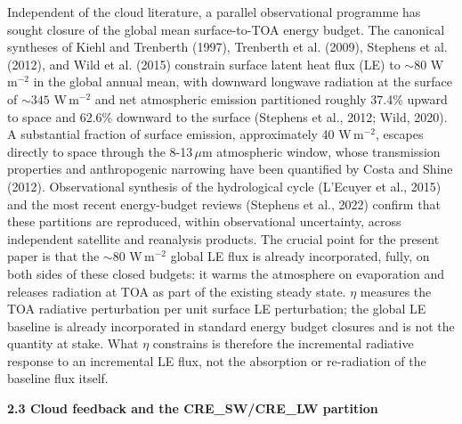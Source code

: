 Independent of the cloud literature, a parallel observational programme has sought closure of the global mean surface-to-TOA energy budget. The canonical syntheses of Kiehl and Trenberth (1997), Trenberth et al. (2009), Stephens et al. (2012), and Wild et al. (2015) constrain surface latent heat flux (LE) to $\sim 80$ W\,m$^{-2}$ in the global annual mean, with downward longwave radiation at the surface of $\sim 345$ W\,m$^{-2}$ and net atmospheric emission partitioned roughly 37.4\% upward to space and 62.6\% downward to the surface (Stephens et al., 2012; Wild, 2020). A substantial fraction of surface emission, approximately 40 W\,m$^{-2}$, escapes directly to space through the 8-13\,$\mu$m atmospheric window, whose transmission properties and anthropogenic narrowing have been quantified by Costa and Shine (2012). Observational synthesis of the hydrological cycle (L'Ecuyer et al., 2015) and the most recent energy-budget reviews (Stephens et al., 2022) confirm that these partitions are reproduced, within observational uncertainty, across independent satellite and reanalysis products. The crucial point for the present paper is that the $\sim 80$ W\,m$^{-2}$ global LE flux is already incorporated, fully, on both sides of these closed budgets: it warms the atmosphere on evaporation and releases radiation at TOA as part of the existing steady state. $\eta$ measures the TOA radiative perturbation per unit surface LE perturbation; the global LE baseline is already incorporated in standard energy budget closures and is not the quantity at stake. What $\eta$ constrains is therefore the incremental radiative response to an incremental LE flux, not the absorption or re-radiation of the baseline flux itself.

\textbf{2.3 Cloud feedback and the CRE_SW/CRE_LW partition}

